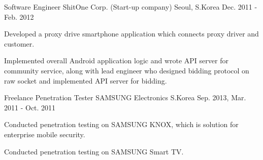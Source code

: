 \begin{cventries}
  \cventry
    {Software Engineer} %
    {ShitOne Corp. (Start-up company)} %
    {Seoul, S.Korea} %
    {Dec. 2011 - Feb. 2012} %
    {
      \begin{cvitems} %
        \item {Developed a proxy drive smartphone application which connects proxy driver and customer.}
        \item {Implemented overall Android application logic and wrote API server for community service, along with lead engineer who designed bidding protocol on raw socket and implemented API server for bidding.}
      \end{cvitems}
    }

  \cventry
    {Freelance Penetration Tester} %
    {SAMSUNG Electronics} %
    {S.Korea} %
    {Sep. 2013, Mar. 2011 - Oct. 2011} %
    {
      \begin{cvitems} %
        \item {Conducted penetration testing on SAMSUNG KNOX, which is solution for enterprise mobile security.}
        \item {Conducted penetration testing on SAMSUNG Smart TV.}
      \end{cvitems}
    }

\end{cventries}
